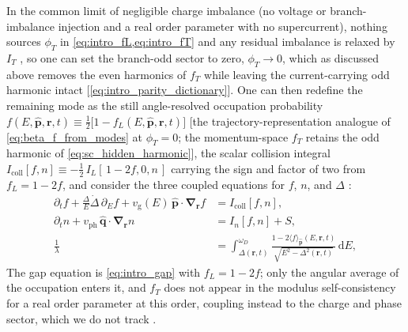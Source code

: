 \documentclass[
  aps,
  prb,
  preprint,
  superscriptaddress,
  longbibliography,
  nofootinbib
]{revtex4-2}
\newcommand{\dd}{\mathrm{d}}
\newcommand{\br}{\mathbf{r}}
\newcommand{\bp}{\mathbf{p}}
\newcommand{\bnabla}{\boldsymbol{\nabla}}
\newcommand{\vg}{v_{\mathrm{g}}}
\newcommand{\Icoll}{I_{\mathrm{coll}}}
\newcommand{\fL}{f_L}
\newcommand{\fT}{f_T}
\begin{document}
In the common limit of negligible charge imbalance (no voltage or
branch-imbalance injection and a real order parameter with no
supercurrent), nothing sources \(\phi_T\) in
\cref{eq:intro_fL,eq:intro_fT} and any residual imbalance is relaxed by
\(I_{T}\) \cite{tinkham2004}, so one can set the branch-odd sector to
zero, \(\phi_T\to0\), which as discussed above removes the even
harmonics of \(\fT\) while leaving the current-carrying odd harmonic
intact [\cref{eq:intro_parity_dictionary}]. One can then redefine the remaining
mode as the still angle-resolved occupation probability
\(f(E,\hat{\bp},\br,t)\equiv\tfrac{1}{2}\bigl[1-\fL(E,\hat{\bp},\br,t)\bigr]\)
[the trajectory-representation analogue of \cref{eq:beta_f_from_modes} at
\(\phi_T=0\); the momentum-space \(\fT\) retains the odd harmonic of
\cref{eq:sc_hidden_harmonic}], the scalar collision integral
\(\Icoll[f,n]\equiv-\tfrac12\,I_L[\,1-2f,0,n\,]\) carrying the sign and
factor of two from \(\fL=1-2f\), and consider the three coupled
equations for \(f\), \(n\), and \(\Delta\)
\cite{changscalapino1977,goldie2013,catelani2019}:
\begin{align}
  \partial_t f
  + \frac{\Delta}{E}\dot{\Delta}\,\partial_E f
  + \vg(E)\,\hat{\bp}\cdot\bnabla_{\br}f
  &=
  \Icoll[f,n],
  \label{eq:intro_three_f}
  \\
  \partial_t n
  +
  v_{\mathrm{ph}}\,\hat{\mathbf{q}}\cdot\bnabla_{\br} n
  &=
  I_{n}[f,n]
  +
  S,
  \label{eq:intro_three_phonon}
  \\
  \frac{1}{\lambda}
  &=
  \int_{\Delta(\br,t)}^{\omega_D}
  \frac{1-2\langle f\rangle_{\hat{\bp}}(E,\br,t)}{\sqrt{E^{2}-\Delta^{2}(\br,t)}}\,
  \dd E,
  \label{eq:intro_three_gap}
\end{align}
The gap equation is \cref{eq:intro_gap} with \(\fL=1-2f\); only the
angular average of the occupation enters it, and \(\fT\) does not
appear in the modulus self-consistency for a real order parameter at
this order, coupling instead to the charge and phase sector, which we
do not track \cite{tinkham2004,schmidschon1975}.
\end{document}

